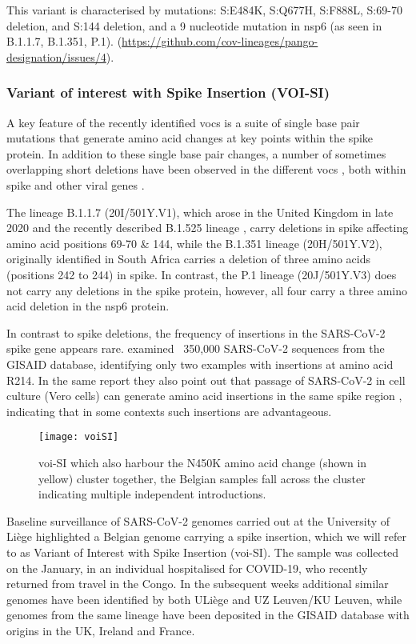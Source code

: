 This variant is characterised by mutations: S:E484K, S:Q677H, S:F888L, S:69-70 deletion, and S:144 deletion, and a 9 nucleotide mutation in nsp6 (as seen in B.1.1.7, B.1.351, P.1). (\url{https://github.com/cov-lineages/pango-designation/issues/4}).

\subsubsection{Variant of interest with Spike Insertion (VOI-SI)}
A key feature of the recently identified \gls{voc}s is a suite of single base pair mutations that generate amino acid changes at key points within the spike protein.
In addition to these single base pair changes, a number of sometimes overlapping short deletions have been observed in the different \gls{voc}s \citep{garry2021spike}, both within spike and other viral genes \citep{pango4}.

The lineage B.1.1.7 (20I/501Y.V1), which arose in the United Kingdom in late 2020 \citep{rambaut2020preliminary} and the recently described B.1.525 lineage \citep{pango4}, carry deletions in spike affecting amino acid positions 69-70 & 144, while the B.1.351 lineage (20H/501Y.V2), originally identified in South Africa \citep{Tegally2020} carries a deletion of three amino acids (positions 242 to 244) in spike.
In contrast, the P.1 lineage (20J/501Y.V3) \citep{faria2021genomic} does not carry any deletions in the spike protein, however, all four carry a three amino acid deletion in the nsp6 protein.

In contrast to spike deletions, the frequency of insertions in the SARS-CoV-2 spike gene appears rare. \citet{garry2021spike} examined ~350,000 SARS-CoV-2 sequences from the GISAID database, identifying only two examples with insertions at amino acid R214.
In the same report they also point out that passage of SARS-CoV-2 in cell culture (Vero cells) can generate amino acid insertions in the same spike region \citep{garry2021spike}, indicating that in some contexts such insertions are advantageous.

\begin{figure}[ht]
  \centering
  \texttt{[image: voiSI]}
  \caption[VOI-SI monitoring]{\gls{voi}-SI which also harbour the N450K amino acid change (shown in yellow) cluster together, the Belgian samples fall across the cluster indicating multiple independent introductions.}
  \label{fig:voiSI}
\end{figure}

Baseline surveillance of SARS-CoV-2 genomes carried out at the University of Li\`{e}ge highlighted a Belgian genome carrying a spike insertion, which we will refer to as Variant of Interest with Spike Insertion (\gls{voi}-SI).
The sample was collected on the  January, in an individual hospitalised for COVID-19, who recently returned from travel in the Congo.
In the subsequent weeks additional similar genomes have been identified by both ULi\`{e}ge and UZ Leuven/KU Leuven, while genomes from the same lineage have been deposited in the GISAID database with origins in the UK, Ireland and France.

